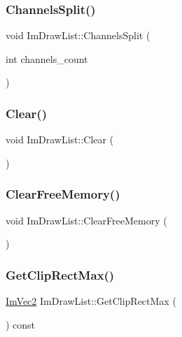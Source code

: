 \subsubsection{\texorpdfstring{Channels\+Split()}{ChannelsSplit()}}
{\footnotesize\ttfamily void Im\+Draw\+List\+::\+Channels\+Split (\begin{DoxyParamCaption}\item[{int}]{channels\+\_\+count }\end{DoxyParamCaption})}

\hypertarget{struct_im_draw_list_ac422590c71dc5593aea52f65793aee81}{}\label{struct_im_draw_list_ac422590c71dc5593aea52f65793aee81} 
\subsubsection{\texorpdfstring{Clear()}{Clear()}}
{\footnotesize\ttfamily void Im\+Draw\+List\+::\+Clear (\begin{DoxyParamCaption}{ }\end{DoxyParamCaption})}

\hypertarget{struct_im_draw_list_a8b2686e006f57c554b709dfc47e2ad63}{}\label{struct_im_draw_list_a8b2686e006f57c554b709dfc47e2ad63} 
\subsubsection{\texorpdfstring{Clear\+Free\+Memory()}{ClearFreeMemory()}}
{\footnotesize\ttfamily void Im\+Draw\+List\+::\+Clear\+Free\+Memory (\begin{DoxyParamCaption}{ }\end{DoxyParamCaption})}

\hypertarget{struct_im_draw_list_a8e484a61eab501c1c1c416a8b45bb08e}{}\label{struct_im_draw_list_a8e484a61eab501c1c1c416a8b45bb08e} 
\subsubsection{\texorpdfstring{Get\+Clip\+Rect\+Max()}{GetClipRectMax()}}
{\footnotesize\ttfamily \hyperlink{struct_im_vec2}{Im\+Vec2} Im\+Draw\+List\+::\+Get\+Clip\+Rect\+Max (\begin{DoxyParamCaption}{ }\end{DoxyParamCaption}) const}

